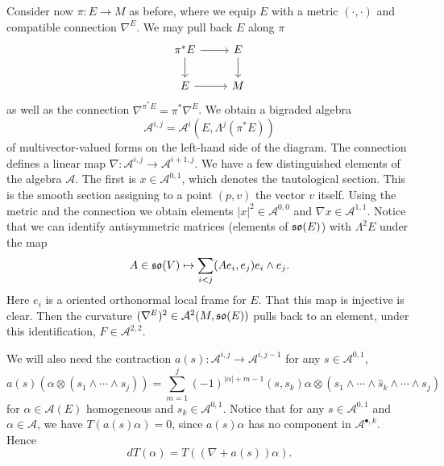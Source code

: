 \documentclass{amsart}
\begin{document}
Consider now $\pi: E\to M$ as before, where we equip $E$ with a metric $(\cdot,\cdot)$
and compatible connection $\nabla^E$. We may pull back $E$ along $\pi$
\begin{equation*}
    \begin{tikzcd}
        \pi^*E \rar\dar & E\dar\\
        E\rar & M
    \end{tikzcd}
\end{equation*}
as well as the connection $\nabla^{\pi^*E}=\pi^*\nabla^E$.
We obtain a bigraded algebra
\begin{equation*}
    \mathcal{A}^{i,j} = \mathcal{A}^i(E, \Lambda^j(\pi^*E))
\end{equation*}
of multivector-valued forms on the left-hand side of the diagram. The connection
defines a linear map $\nabla: \mathcal{A}^{i,j}\to \mathcal{A}^{i+1,j}$.
We have a few distinguished elements of the algebra $\mathcal{A}$. The first
is $x\in \mathcal{A}^{0,1}$, which denotes the tautological section. This
is the smooth section assigning to a point $(p,v)$ the vector $v$ itself.
Using the metric and the connection we obtain elements $|x|^2\in \mathcal{A}^{0,0}$
and $\nabla x\in \mathcal{A}^{1,1}$.
Notice that we can identify antisymmetric matrices (elements of $\mathfrak{so}(E)$)
with $\Lambda^2E$ under the map
\begin{equation*}
    A\in\mathfrak{so}(V) \mapsto \sum_{i<j} (Ae_i, e_j)e_i\wedge e_j.
\end{equation*}
Here $e_i$ is a oriented orthonormal local frame for $E$.
That this map is injective is clear.
Then the curvature $(\nabla^E)^2\in \mathcal{A}^2(M,\mathfrak{so}(E))$
pulls back to an element, under this identification, $F\in \mathcal{A}^{2,2}$.

We will also need the contraction $a(s):\mathcal{A}^{i,j}\to \mathcal{A}^{i,j-1}$
for any $s\in \mathcal{A}^{0,1}$,
\begin{equation*}
    a(s)(\alpha\otimes(s_1\wedge\cdots\wedge s_j)) = \sum_{m=1}^j(-1)^{|\alpha|+m-1}(s,s_k)\alpha
    \otimes(s_1\wedge\cdots\wedge \hat s_k\wedge\cdots\wedge s_j)
\end{equation*}
for $\alpha\in \mathcal{A}(E)$ homogeneous and $s_k\in \mathcal{A}^{0,1}$.
Notice that for any $s\in \mathcal{A}^{0,1}$ and $\alpha\in \mathcal{A}$, we have
$T(a(s)\alpha)=0$, since $a(s)\alpha$ has no component in $\mathcal{A}^{\bullet, k}$.
Hence
\begin{equation*}
    dT(\alpha) = T( (\nabla + a(s))\alpha).
\end{equation*}
\end{document}
